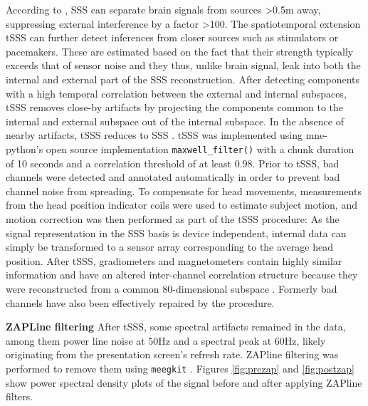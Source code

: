 According to \citet{taulu2006spatiotemporal}, \gls{SSS} can separate brain signals from sources >0.5m away, suppressing external interference by a factor >100.
The spatiotemporal extension \gls{tSSS} can further detect inferences from closer sources such as stimulators or pacemakers.
These are estimated based on the fact that their strength typically exceeds that of sensor noise and they thus, unlike brain signal, leak into both the internal and external part of the \gls{SSS} reconstruction.
After detecting components with a high temporal correlation between the external and internal subspaces, \gls{tSSS} removes close-by artifacts by projecting the components common to the internal and external subspace out of the internal subspace.
In the absence of nearby artifacts, \gls{tSSS} reduces to \gls{SSS} \citep{taulu2009removal}.
\gls{tSSS} was implemented using mne-python's open source implementation \texttt{maxwell\_filter()} with a chunk duration of 10 seconds and a correlation threshold of at least $0.98$.
Prior to \gls{tSSS}, bad channels were detected and annotated automatically in order to prevent bad channel noise from spreading.
To compensate for head movements, measurements from the head position indicator coils were used to estimate subject motion, and motion correction was then performed as part of the \gls{tSSS} procedure: As the signal representation in the \gls{SSS} basis is device independent, internal data can simply be transformed to a sensor array corresponding to the average head position.
After \gls{tSSS}, gradiometers and magnetometers contain highly similar information and have an altered inter-channel correlation structure because they were reconstructed from a common 80-dimensional subspace \citep{jas2018reproducible}.
Formerly bad channels have also been effectively repaired by the procedure.

\textbf{ZAPLine filtering} After \gls{tSSS}, some spectral artifacts remained in the data, among them power line noise at 50Hz and a spectral peak at 60Hz, likely originating from the presentation screen's refresh rate.
ZAPline filtering \citep{de2020zapline} was performed to remove them using \texttt{meegkit} \citep{barascud2022}.
Figures \ref{fig:prezap} and \ref{fig:postzap} show power spectral density plots of the signal before and after applying ZAPline filters.


